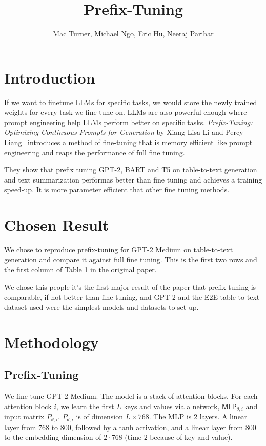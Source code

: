 \documentclass[11pt]{article} %
\title{Prefix-Tuning}
\author{Mac Turner, Michael Ngo, Eric Hu, Neeraj Parihar}
\begin{document}
\maketitle

\section{Introduction}
If we want to finetune LLMs for specific tasks, we would store the newly trained weights for every task we fine tune on. LLMs are also powerful enough where prompt engineering help LLMs perform better on specific tasks. \textit{Prefix-Tuning: Optimizing Continuous Prompts for Generation} by Xiang Lisa Li and Percy Liang~\cite{li-liang-2021-prefix} introduces a method of fine-tuning that is memory efficient like prompt engineering and reaps the performance of full fine tuning.

They show that prefix tuning GPT-2, BART and T5 on table-to-text generation and text summarization performas better than fine tuning and achieves a training speed-up. It is more parameter efficient that other fine tuning methods.

\section{Chosen Result}

We chose to reproduce prefix-tuning for GPT-2 Medium on table-to-text generation and compare it against full fine tuning. This is the first two rows and the first column of Table 1 in the original paper.

We chose this people it's the first major result of the paper that prefix-tuning is comparable, if not better than fine tuning, and GPT-2 and the E2E table-to-text dataset used were the simplest models and datasets to set up.

\section{Methodology}


\subsection{Prefix-Tuning}
We fine-tune GPT-2 Medium. The model is a stack of attention blocks. For each attention block $i$, we learn the first $L$ keys and values via a network, $\textsf{MLP}_{\theta,i}$ and input matrix $P_{\theta,i}$. $P_{\theta,i}$ is of dimension $L\times 768$. The MLP is 2 layers. A linear layer from $768$ to $800$, followed by a tanh activation, and a linear layer from $800$ to the embedding dimension of $2\cdot 768$ (time $2$ because of key and value).
\end{document}
